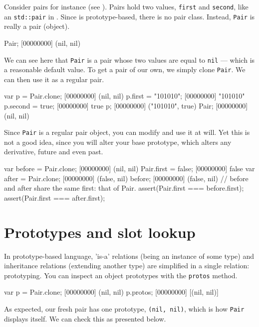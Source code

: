 Consider pairs for instance (see ). Pairs hold two
values, \lstinline|first| and \lstinline|second|, like an
\lstinline{std::pair} in \Cxx. Since \us is prototype-based, there is
no pair class. Instead, \lstinline|Pair| is really a pair (object).

\begin{urbiscript}
Pair;
[00000000] (nil, nil)
\end{urbiscript}

We can see here that \lstinline|Pair| is a pair whose two values are
equal to \lstinline|nil| --- which is a reasonable default value. To
get a pair of our own, we simply clone \lstinline|Pair|.  We can then
use it as a regular pair.

\begin{urbiscript}
var p = Pair.clone;
[00000000] (nil, nil)
p.first = "101010";
[00000000] "101010"
p.second = true;
[00000000] true
p;
[00000000] ("101010", true)
Pair;
[00000000] (nil, nil)
\end{urbiscript}

Since \lstinline|Pair| is a regular pair object, you can modify and
use it at will. Yet this is not a good idea, since you will alter your
base prototype, which alters any derivative, future and even past.

\begin{urbiscript}
var before = Pair.clone;
[00000000] (nil, nil)
Pair.first = false;
[00000000] false
var after = Pair.clone;
[00000000] (false, nil)
before;
[00000000] (false, nil)
// before and after share the same first: that of Pair.
assert(Pair.first === before.first);
assert(Pair.first === after.first);
\end{urbiscript}

\section{Prototypes and slot lookup}

In prototype-based language, 'is-a' relations (being an instance of
some type) and inheritance relations (extending another type) are
simplified in a single relation: prototyping. You can inspect an
object prototypes with the \lstinline{protos} method.

\begin{urbiscript}
var p = Pair.clone;
[00000000] (nil, nil)
p.protos;
[00000000] [(nil, nil)]
\end{urbiscript}

As expected, our fresh pair has one prototype, \lstinline|(nil, nil)|,
which is how \lstinline|Pair| displays itself. We can check this as
presented below.

